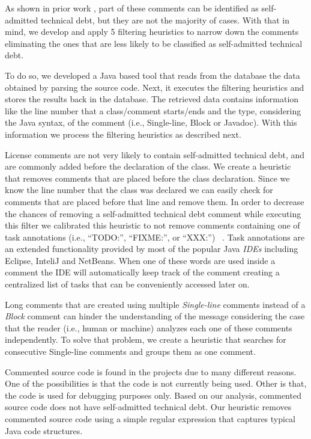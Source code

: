 As shown in prior work , part of these comments can be identified as self-admitted technical debt, but they are not the majority of cases. With that in mind, we develop and apply 5 filtering heuristics to narrow down the comments eliminating the ones that are less likely to be classified as self-admitted technical debt.

To do so, we developed a Java based tool that reads from the database the data obtained by parsing the source code. Next, it executes the filtering heuristics and stores the results back in the database. The retrieved data contains information like the line number that a class/comment starts/ends and the type, considering the Java syntax, of the comment (i.e., Single-line, Block or Javadoc). With this information we process the filtering heuristics as described next.

License comments are not very likely to contain self-admitted technical debt, and are commonly added before the declaration of the class. We create a heuristic that removes comments that are placed before the class declaration. Since we know the line number that the class was declared we can easily check for comments that are placed before that line and remove them. In order to decrease the chances of removing a self-admitted technical debt comment while executing this filter we calibrated this heuristic to not remove comments containing one of task annotations (i.e., ``TODO:'', ``FIXME:'', or ``XXX:'') ~\cite{Storey2008ICSE}. Task annotations are an extended functionality provided by most of the popular Java \textit{IDEs} including Eclipse, InteliJ and NetBeans. When one of these words are used inside a comment the IDE will automatically keep track of the comment creating a centralized list of tasks that can be conveniently accessed later on.

Long comments that are created using multiple \emph{Single-line} comments instead of a \emph{Block} comment can hinder the understanding of the message considering the case that the reader (i.e., human or machine) analyzes each one of these comments independently. To solve that problem, we create a heuristic that searches for consecutive Single-line comments and groups them as one comment.
 
Commented source code is found in the projects due to many different reasons. One of the possibilities is that the code is not currently being used. Other is that, the code is used for debugging purposes only. Based on our analysis, commented source code does not have self-admitted technical debt. Our heuristic removes commented source code using a simple regular expression that captures typical Java code structures.

